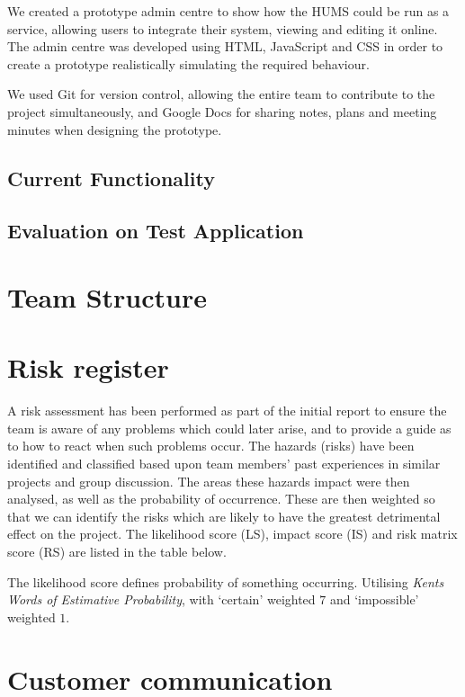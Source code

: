 \documentclass[10pt,a4paper]{article}
\begin{document}
We created a prototype admin centre to show how the HUMS could be run as a service, allowing users to integrate their system, viewing and editing it online. The admin centre was developed using HTML, JavaScript and CSS in order to create a prototype realistically simulating the required behaviour.

We used Git for version control, allowing the entire team to contribute to the project simultaneously, and Google Docs for sharing notes, plans and meeting minutes when designing the prototype.
\subsection{Current Functionality}

\subsection{Evaluation on Test Application}

\section{Team Structure}

\section{Risk register}

A risk assessment has been performed as part of the initial report to ensure the
team is aware of any problems which could later arise, and to provide a guide as
to how to react when such problems occur. The hazards (risks) have been
identified and classified based upon team members' past experiences in similar
projects and group discussion. The areas these hazards impact were then
analysed, as well as the probability of occurrence. These are then weighted so
that we can identify the risks which are likely to have the greatest detrimental
effect on the project. The likelihood score (LS), impact score (IS) and risk matrix score 
(RS) are
listed in the table below.



The likelihood score defines probability of something occurring. Utilising
\textit{Kents Words of Estimative Probability}\cite{kent1966strategic}, with
`certain' weighted $7$ and `impossible' weighted $1$.




\section{Customer communication}

\vfill


\end{document}
